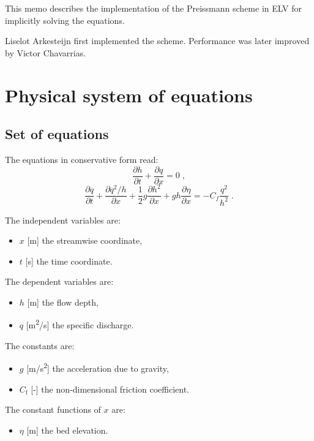 \documentclass{deltares_report_elv}
\newcommand{\ELV}{\textsc{ELV}}
\newcommand{\mathsub}[2]{#1_{\mathrm{#2}}}
\begin{document}

This memo describes the implementation of the Preissmann scheme \citep{Preissmann61_2,Preissman61_3,Lyn87_2} in \ELV{} for implicitly solving the \citet{SaintVenant71} equations. 

Liselot Arkesteijn first implemented the scheme. Performance was later improved by Victor Chavarrias. 

\section{Physical system of equations}

\subsection{Set of equations}

The \citet{SaintVenant71} equations in conservative form read:
\begin{equation}
\label{eq:sv_mass}
\frac{\partial h}{\partial t}+\frac{\partial q}{\partial x}=0 \;,
\end{equation}
\begin{equation}
\label{eq:sv_mom}
\frac{\partial q}{\partial t}+\frac{\partial q^2/h}{\partial x}+\frac{1}{2}g\frac{\partial h^2}{\partial x}+gh\frac{\partial \eta}{\partial x}=-C_f\frac{q^2}{h^2} \;.
\end{equation}

The independent variables are:
\begin{itemize}
\item $x$ [\si{m}] the streamwise coordinate,
\item $t$ [\si{s}] the time coordinate.
\end{itemize}

The dependent variables are:
\begin{itemize}
\item $h$ [\si{m}] the flow depth,
\item $q$ [\si{m^2/s}] the specific discharge.
\end{itemize}

The constants are:
\begin{itemize}
\item $g$ [\si{m/s^2}] the acceleration due to gravity,
\item $\mathsub{C}{f}$ [-] the non-dimensional friction coefficient.
\end{itemize}

The constant functions of $x$ are:
\begin{itemize}
\item $\eta$ [\si{m}] the bed elevation. 
\end{itemize}
\end{document}
